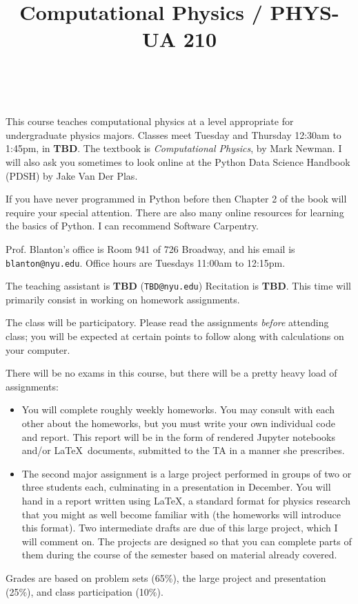 \documentclass[11pt, preprint]{aastex}
\begin{document}
\title{\bf Computational Physics / PHYS-UA 210}
~
~

\noindent This course teaches computational physics at a level
appropriate for undergraduate physics majors.  Classes meet Tuesday
and Thursday 12:30am to 1:45pm, in {\bf TBD}.  The textbook is {\it
  Computational Physics}, by Mark Newman. I will also ask you
sometimes to look online at the Python Data Science Handbook (PDSH) by
Jake Van Der Plas.

\noindent If you have never programmed in Python before then Chapter 2
of the book will require your special attention. There are also many
online resources for learning the basics of Python. I can recommend
Software Carpentry.

\noindent Prof. Blanton's office is Room 941 of 726 Broadway, and his
email is {\tt blanton@nyu.edu}.  Office hours are Tuesdays 11:00am to
12:15pm.

\noindent The teaching assistant is {\bf TBD} ({\tt TBD@nyu.edu})
Recitation is {\bf TBD}. This time will primarily consist in working
on homework assignments.

\noindent The class will be participatory. Please read the assignments
          {\it before} attending class; you will be expected at
          certain points to follow along with calculations on your
          computer.

\noindent There will be no exams in this course, but there will be a
pretty heavy load of assignments:
\begin{itemize}
\item You will complete roughly weekly homeworks. You may consult with
  each other about the homeworks, but you must write your own
  individual code and report. This report will be in the form of
  rendered Jupyter notebooks and/or \LaTeX\ documents, submitted to
  the TA in a manner she prescribes.
\item The second major assignment is a large project performed in
  groups of two or three students each, culminating in a presentation
  in December. You will hand in a report written using \LaTeX, a
  standard format for physics research that you might as well become
  familiar with (the homeworks will introduce this format). Two
  intermediate drafts are due of this large project, which I will
  comment on. The projects are designed so that you can complete parts
  of them during the course of the semester based on
  material already covered. 
\end{itemize}

\noindent Grades are based on problem sets (65\%), the large project
and presentation (25\%), and class participation (10\%).
\end{document}
